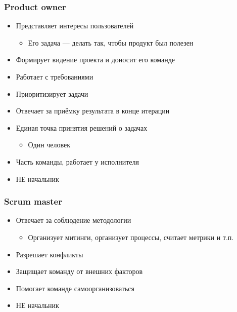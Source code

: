 \documentclass[xetex,mathserif,serif]{beamer}
\begin{document}
    \begin{frame}
        \frametitle{Product owner}
        \begin{itemize}
            \item Представляет интересы пользователей
            \begin{itemize}
                \item Его задача --- делать так, чтобы продукт был полезен
            \end{itemize}
            \item Формирует видение проекта и доносит его команде
            \item Работает с требованиями
            \item Приоритизирует задачи
            \item Отвечает за приёмку результата в конце итерации
            \item Единая точка принятия решений о задачах
            \begin{itemize}
                \item Один человек
            \end{itemize}
            \item Часть команды, работает у исполнителя
            \item НЕ начальник
        \end{itemize}
    \end{frame}

    \begin{frame}
        \frametitle{Scrum master}
        \begin{itemize}
            \item Отвечает за соблюдение методологии
            \begin{itemize}
                \item Организует митинги, организует процессы, считает метрики и т.п.
            \end{itemize}
            \item Разрешает конфликты
            \item Защищает команду от внешних факторов
            \item Помогает команде самоорганизоваться
            \item НЕ начальник
        \end{itemize}
    \end{frame}
\end{document}
